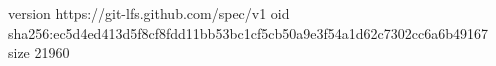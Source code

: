 version https://git-lfs.github.com/spec/v1
oid sha256:ec5d4ed413d5f8cf8fdd11bb53bc1cf5cb50a9e3f54a1d62c7302cc6a6b49167
size 21960
